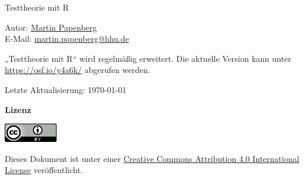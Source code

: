 
\clearpage

\Large

\noindent Testtheorie mit R

\noindent
Autor: \href{https://m-py.github.io/about/index.html}{Martin Papenberg} \\
E-Mail: \href{mailto:martin.papenberg@hhu.de}{martin.papenberg@hhu.de}
\\

\vspace{1cm}

\noindent „Testtheorie mit R“ wird regelmäßig erweitert. Die aktuelle Version kann unter
\href{https://osf.io/y4a6k/}{https://osf.io/y4a6k/} abgerufen werden. \\

\vspace{0.3cm}

\noindent Letzte Aktualisierung: \today

\vspace{2cm}

\noindent \textbf{Lizenz}

\vspace{0.3cm}

\noindent \includegraphics[width=88px]{./images/licence.png}

\vspace{0.2cm}

\noindent Dieses Dokument ist unter einer
\href{http://creativecommons.org/licenses/by/4.0/}{Creative Commons
  Attribution 4.0 International License} veröffentlicht.

\normalsize

\newenvironment{block}
    {\begin{center}
    \begin{tabular}{|p{0.9\textwidth}|}
    \hline\\
    }
    {
    \\\hline
    \end{tabular}
    \end{center}
    }

\clearpage
